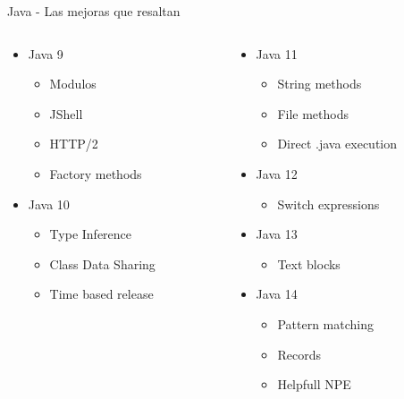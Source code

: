 \documentclass[aspectratio=169]{beamer}
\begin{document}
\begin{frame}[fragile]{Java - Las mejoras que resaltan}
	\begin{columns}[T] %

		\begin{column}[T]{5cm} %
			\begin{itemize}
				\item Java 9
				\begin{itemize}
					\item Modulos
					\item JShell
					\item HTTP/2
                    \item Factory methods
				\end{itemize}
				\item Java 10
				\begin{itemize}
					\item Type Inference
					\item Class Data Sharing
					\item Time based release
				\end{itemize}
			\end{itemize}
		\end{column}
		\begin{column}[T]{5cm} %
			\begin{itemize}
                \item Java 11
                \begin{itemize}
                    \item String methods
                    \item File methods
                    \item Direct .java execution
                \end{itemize}
				\item Java 12
				\begin{itemize}
					\item Switch expressions
				\end{itemize}
				\item Java 13
				\begin{itemize}
					\item Text blocks
				\end{itemize}
				\item Java 14
				\begin{itemize}
					\item Pattern matching
					\item Records
					\item Helpfull NPE
				\end{itemize}
			\end{itemize}
		\end{column}
	\end{columns}
\end{frame}
\end{document}
